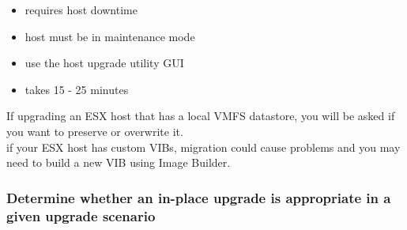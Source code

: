 \begin{itemize}
\item requires host downtime
\item host must be in maintenance mode
\item use the host upgrade utility GUI
\item takes 15 - 25 minutes
\end{itemize}

If upgrading an ESX host that has a local VMFS datastore, you will be asked
if you want to preserve or overwrite it.\\

if your ESX host has custom VIBs, migration could cause problems and you may
need to build a new VIB using Image Builder.

\subsubsection{Determine whether an in-place upgrade is appropriate in a given upgrade scenario}
